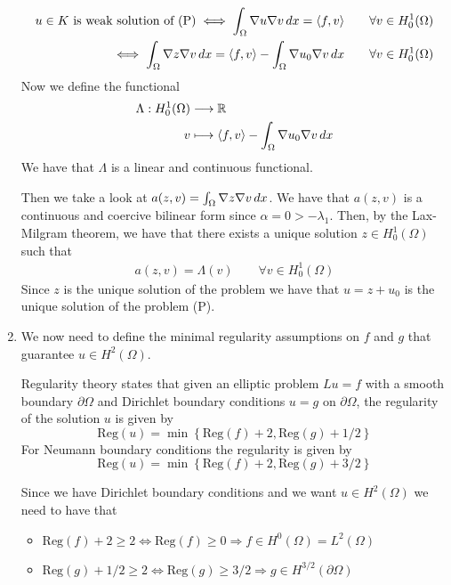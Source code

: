 \begin{enumerate}
          \[
              \begin{split}
                  u \in K \text{ is weak solution of (P)} \iff \int_\Omega \nabla u \nabla v \, dx = \langle f, v \rangle \qquad \forall v \in H^1_0(\Omega) \\
                  \iff \int_\Omega \nabla z \nabla v \, dx = \langle f, v \rangle - \int_\Omega \nabla u_0 \nabla v \, dx \qquad \forall v \in H^1_0(\Omega)
              \end{split}
          \]
          Now we define the functional
          \begin{align*}
              \Lambda: H^1_0(\Omega) & \longrightarrow \mathbb{R}                                                  \\
              v                      & \longmapsto \langle f, v \rangle - \int_\Omega \nabla u_0 \nabla v \, dx
          \end{align*}
          We have that \(\Lambda\) is a linear and continuous functional.

          Then we take a look at \(a(z, v) = \int_\Omega \nabla z \nabla v \, dx\). We have
          that \(a(z, v)\) is a continuous and coercive bilinear form since \(\alpha = 0
          > -\lambda_1\). Then, by the Lax-Milgram theorem, we have that there exists a
          unique solution \(z \in H^1_0(\Omega)\) such that
          \[
              \begin{split}
                  a(z, v) = \Lambda(v) \qquad \forall v \in H^1_0(\Omega)
              \end{split}
          \]
          Since \(z\) is the unique solution of the problem we have that \(u = z + u_0\)
          is the unique solution of the problem (P).
    \item We now need to define the minimal regularity assumptions on \(f\) and \(g\)
          that guarantee \(u \in H^2(\Omega)\).
          \begin{remark}
              Regularity theory states that given an elliptic problem \(Lu = f\) with a smooth boundary \(\partial\Omega\) and Dirichlet boundary conditions \(u = g\) on \(\partial\Omega\), the regularity of the solution \(u\) is given by
              \[
                  \text{Reg}(u) = \min\left\{\text{Reg}(f) + 2, \text{Reg}(g) + 1/2\right\}
              \]
              For Neumann boundary conditions the regularity is given by
              \[
                  \text{Reg}(u) = \min\left\{\text{Reg}(f) + 2, \text{Reg}(g) + 3/2\right\}
              \]
          \end{remark}
          Since we have Dirichlet boundary conditions and we want \(u \in H^2(\Omega)\) we need to have that
          \begin{itemize}
              \item \(\text{Reg}(f) + 2 \geq 2 \iff \text{Reg}(f) \geq 0 \Rightarrow f \in H^0(\Omega) = L^2(\Omega)\)
              \item \(\text{Reg}(g) + 1/2 \geq 2 \iff \text{Reg}(g) \geq 3/2 \Rightarrow g \in H^{3/2}(\partial\Omega)\)
          \end{itemize}
\end{enumerate}

